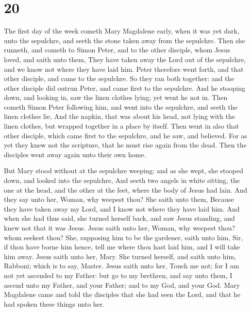 \hypertarget{section-19}{%
\section{20}\label{section-19}}

 The first day of the week cometh Mary Magdalene early, when
it was yet dark, unto the sepulchre, and seeth the stone taken away from
the sepulchre.  Then she runneth, and cometh to Simon Peter,
and to the other disciple, whom Jesus loved, and saith unto them, They
have taken away the Lord out of the sepulchre, and we know not where
they have laid him.  Peter therefore went forth, and that
other disciple, and came to the sepulchre.  So they ran both
together: and the other disciple did outrun Peter, and came first to the
sepulchre.  And he stooping down, and looking in, saw the
linen clothes lying; yet went he not in.  Then cometh Simon
Peter following him, and went into the sepulchre, and seeth the linen
clothes lie,  And the napkin, that was about his head, not
lying with the linen clothes, but wrapped together in a place by itself.
 Then went in also that other disciple, which came first to
the sepulchre, and he saw, and believed.  For as yet they
knew not the scripture, that he must rise again from the dead.
 Then the disciples went away again unto their own home.

 But Mary stood without at the sepulchre weeping: and as
she wept, she stooped down, and looked into the sepulchre, 
And seeth two angels in white sitting, the one at the head, and the
other at the feet, where the body of Jesus had lain.  And
they say unto her, Woman, why weepest thou? She saith unto them, Because
they have taken away my Lord, and I know not where they have laid him.
 And when she had thus said, she turned herself back, and
saw Jesus standing, and knew not that it was Jesus.  Jesus
saith unto her, Woman, why weepest thou? whom seekest thou? She,
supposing him to be the gardener, saith unto him, Sir, if thou have
borne him hence, tell me where thou hast laid him, and I will take him
away.  Jesus saith unto her, Mary. She turned herself, and
saith unto him, Rabboni; which is to say, Master.  Jesus
saith unto her, Touch me not; for I am not yet ascended to my Father:
but go to my brethren, and say unto them, I ascend unto my Father, and
your Father; and to my God, and your God.  Mary Magdalene
came and told the disciples that she had seen the Lord, and that he had
spoken these things unto her.

